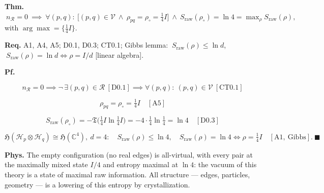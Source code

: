 \begin{theorem}\label{tag:CT0-2}
\textbf{Thm.} $\ n_{\mathcal R}=0\ \implies\ \forall(p,q):\ \bigl[(p,q)\in\mathcal V\ \wedge\ \rho_{pq}=\rho_\circ=\tfrac14 I\bigr]\ \wedge\ S_{\mathrm{raw}}(\rho_\circ)=\ln4=\max_{\rho}S_{\mathrm{raw}}(\rho),$ with $\arg\max=\{\tfrac14 I\}$.

\textbf{Req.} A1, A4, A5; D0.1, D0.3; CT0.1; Gibbs lemma: $\ S_{\mathrm{raw}}(\rho)\le\ln d$, $\ S_{\mathrm{raw}}(\rho)=\ln d\iff\rho=I/d$ [linear algebra].

\textbf{Pf.}

\[
n_{\mathcal R}=0\implies\neg\,\exists(p,q)\in\mathcal R\ [\mathrm{D0.1}]\implies\forall(p,q):\ (p,q)\in\mathcal V\ [\mathrm{CT0.1}]
\]

\[
\rho_{pq}=\rho_\circ=\tfrac14 I\quad[\mathrm{A5}]
\]

\[
S_{\mathrm{raw}}(\rho_\circ)=-\mathfrak T\bigl(\tfrac14 I\ln\tfrac14 I\bigr)=-4\cdot\tfrac14\ln\tfrac14=\ln4\quad[\mathrm{D0.3}]
\]

\[
\mathfrak H(\mathcal H_p\otimes\mathcal H_q)\cong\mathfrak H(\mathbb C^4),\ d=4:\quad S_{\mathrm{raw}}(\rho)\le\ln4,\quad S_{\mathrm{raw}}(\rho)=\ln4\iff\rho=\tfrac14 I\quad[\mathrm{A1},\ \text{Gibbs}].\ \blacksquare
\]

\textbf{Phys.} The empty configuration (no real edges) is all-virtual, with every pair at the maximally mixed state $I/4$ and entropy maximal at $\ln 4$: the vacuum of this theory is a state of maximal raw information. All structure — edges, particles, geometry — is a lowering of this entropy by crystallization.

\end{theorem}

